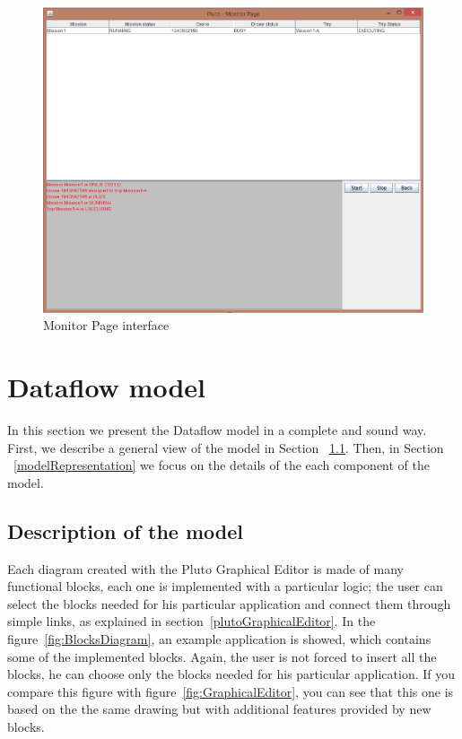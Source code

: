 \begin{figure}[htb]
  \centering
  \includegraphics[width=\linewidth]{pictures/MonitorPage.png}
  \caption{Monitor Page interface}
  \label{fig:MonitorPage}
\end{figure}

\newpage

\section{Dataflow model}\label{dataFlow}

In this section we present the Dataflow model in a complete and sound way.
First, we describe a general view of the model in Section ~\ref{descriprionOfModel}. Then, in Section ~\ref{modelRepresentation} we focus on the details of the each component of the model.


\subsection{Description of the model}
\label{descriprionOfModel}

Each diagram created with the Pluto Graphical Editor is made of many functional blocks, each one is implemented with a particular logic; the user can select the blocks needed for his particular application and connect them through simple links, as explained in section~\ref{plutoGraphicalEditor}.
In the figure~\ref{fig:BlocksDiagram}, an example application is showed, which contains some of the implemented blocks.
Again, the user is not forced to insert all the blocks, he can choose only the blocks needed for his particular application.
If you compare this figure with figure~\ref{fig:GraphicalEditor}, you can see that this one is based on the the same drawing but with additional features provided by new blocks.
\\

